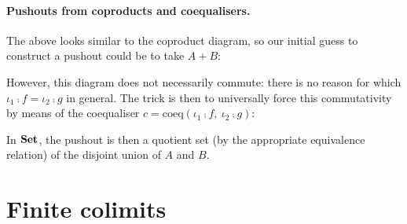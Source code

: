 \paragraph{Pushouts from coproducts and coequalisers.}

The above looks similar to the coproduct diagram, so our initial guess to
construct a pushout could be to take $A + B$:

\begin{center}
\end{center}

However, this diagram does not necessarily commute: there is no reason for
which $\iota_1 \comp f = \iota_2 \comp g$ in general.  The trick is then to
universally force this commutativity by means of the coequaliser 
$c = \text{coeq} (\iota_1 \comp f,\ \iota_2 \comp g )$:

\begin{center}
\end{center}


\begin{example}
In $\mathbf {Set}$, the pushout is then a quotient set (by the appropriate
equivalence relation) of the disjoint union of $A$ and $B$.
\begin{center}
\end{center}
\end{example}

\section{Finite colimits}

